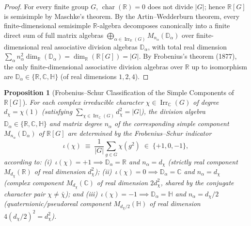 \documentclass[11pt,a4paper]{article}
\newtheorem{proposition}[theorem]{Proposition}
\theoremstyle{definition}
\theoremstyle{remark}
\newcommand{\R}{\mathbb{R}}
\newcommand{\C}{\mathbb{C}}
\newcommand{\quat}{\mathbb{H}}
\newcommand{\Irr}{\operatorname{Irr}}
\begin{document}
\begin{proof}
For every finite group $G$, $\operatorname{char}(\mathbb{R}) = 0$ does not divide $\vert{}G\vert{}$; hence $\mathbb{R}[G]$ is semisimple by Maschke’s theorem. By the Artin--Wedderburn theorem, every finite-dimensional semisimple $\R$-algebra decomposes canonically into a finite direct sum of full matrix algebras $\bigoplus_{\alpha \in \Irr_{\R}(G)} M_{n_\alpha}(\mathbb{D}_\alpha)$ over finite-dimensional real associative division algebras $\mathbb{D}_\alpha$, with total real dimension $\sum_\alpha n_\alpha^2 \dim_{\R}(\mathbb{D}_\alpha) = \dim_{\R}(\R[G]) = |G|$. By Frobenius's theorem (1877), the only finite-dimensional associative division algebras over $\R$ up to isomorphism are $\mathbb{D}_\alpha \in \{\R, \C, \quat\}$ (of real dimensions $1, 2, 4$).
\end{proof}

\begin{proposition}[Frobenius--Schur Classification of the Simple Components of {$\R[G]$}]
\label{prop:frobenius_schur}
For each complex irreducible character $\chi \in \Irr_{\C}(G)$ of degree $d_\chi = \chi(1)$ (satisfying $\sum_{\chi \in \Irr_{\C}(G)} d_\chi^2 = |G|$), the division algebra $\mathbb{D}_\alpha \in \{\R, \C, \quat\}$ and matrix degree $n_\alpha$ of the corresponding simple component $M_{n_\alpha}(\mathbb{D}_\alpha)$ of $\R[G]$ are determined by the Frobenius--Schur indicator
\begin{equation}
\label{eq:fs_indicator}
\iota(\chi) \;\equiv\; \frac{1}{|G|} \sum_{g \in G} \chi(g^2) \;\in\; \{+1, 0, -1\},
\end{equation}
according to: (i)~$\iota(\chi) = +1 \implies \mathbb{D}_\alpha = \R$ and $n_\alpha = d_\chi$ (strictly real component $M_{d_\chi}(\R)$ of real dimension $d_\chi^2$); (ii)~$\iota(\chi) = 0 \implies \mathbb{D}_\alpha = \C$ and $n_\alpha = d_\chi$ (complex component $M_{d_\chi}(\C)$ of real dimension $2d_\chi^2$, shared by the conjugate character pair $\chi \neq \bar{\chi}$); and (iii)~$\iota(\chi) = -1 \implies \mathbb{D}_\alpha = \quat$ and $n_\alpha = d_\chi/2$ (quaternionic/pseudoreal component $M_{d_\chi/2}(\quat)$ of real dimension $4(d_\chi/2)^2 = d_\chi^2$).
\end{proposition}
\end{document}
